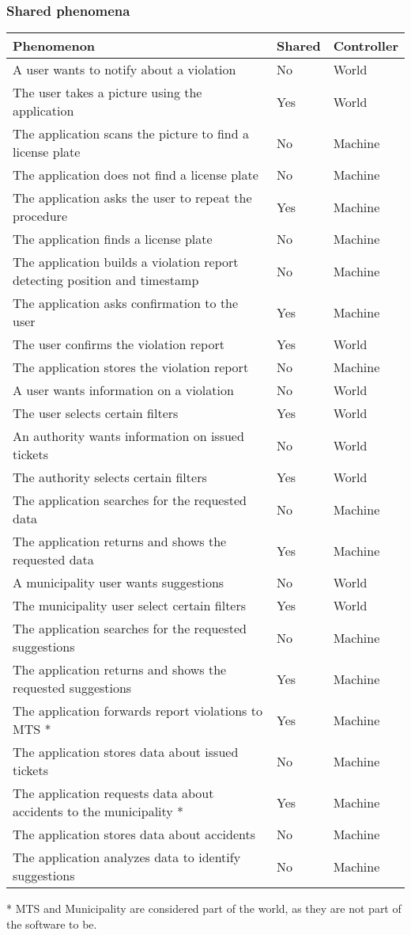 \documentclass[./main.tex]{subfiles}
\begin{document}
\subsubsection{Shared phenomena}

\begin{table}[H]
\centering
\begin{tabularx}{\textwidth}{|X|l|l|}
\hline
Phenomenon & Shared & Controller\tabularnewline
\hline
A user wants to notify about a violation & No & World\tabularnewline
The user takes a picture using the application & Yes &
World\tabularnewline
The application scans the picture to find a license plate & No &
Machine\tabularnewline
The application does not find a license plate & No &
Machine\tabularnewline
The application asks the user to repeat the procedure & Yes &
Machine\tabularnewline
The application finds a license plate & No & Machine\tabularnewline
The application builds a violation report detecting position and
timestamp & No & Machine\tabularnewline
The application asks confirmation to the user & Yes &
Machine\tabularnewline
The user confirms the violation report & Yes & World\tabularnewline
The application stores the violation report & No &
Machine\tabularnewline
A user wants information on a violation & No & World\tabularnewline
The user selects certain filters & Yes & World\tabularnewline
An authority wants information on issued tickets & No &
World\tabularnewline
The authority selects certain filters & Yes & World\tabularnewline
The application searches for the requested data & No &
Machine\tabularnewline
The application returns and shows the requested data & Yes &
Machine\tabularnewline
A municipality user wants suggestions & No & World\tabularnewline
The municipality user select certain filters & Yes &
World\tabularnewline
The application searches for the requested suggestions & No &
Machine\tabularnewline
The application returns and shows the requested suggestions & Yes &
Machine\tabularnewline
The application forwards report violations to MTS * & Yes &
Machine\tabularnewline
The application stores data about issued tickets & No &
Machine\tabularnewline
The application requests data about accidents to the municipality * &
Yes & Machine\tabularnewline
The application stores data about accidents & No &
Machine\tabularnewline
The application analyzes data to identify suggestions & No &
Machine\tabularnewline
\hline
\end{tabularx}
\end{table}

* MTS and Municipality are considered part of the world, as they are not
part of the software to be.
\end{document}
